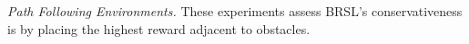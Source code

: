 
\textit{Path Following Environments.}
These experiments assess BRSL's conservativeness is by placing the highest reward adjacent to obstacles.

